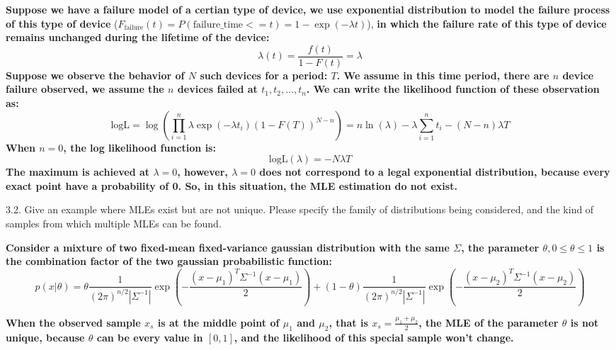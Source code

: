 \documentclass{article}
\theoremstyle{definition}
\theoremstyle{definition}
\theoremstyle{remark}
\begin{document}
\begin{addmargin}[3em]{2em}
  \textbf{Suppose we have a failure model of a certian type of device, we use exponential distribution to model the failure process of this type of device} ($F_{\mbox{failure}}(t) = P(\mbox{failure\_time} <= t) = 1 - \exp(-\lambda t)$), \textbf{in which the failure rate of this type of device remains unchanged during the lifetime of the device:}
  \[
  \lambda(t) = \frac{f(t)}{1 - F(t)} = \lambda
  \]
  \textbf{Suppose we observe the behavior of $N$ such devices for a period: $T$. We assume in this time period, there are $n$ device failure observed, we assume the $n$ devices failed at $t_1, t_2, \dots, t_n$. We can write the likelihood function of these observation as:}
  \[
  \mbox{logL} = \log(\prod_{i=1}^n \lambda \exp(-\lambda t_i) {(1-F(T))}^{N-n}) = n \ln(\lambda) - \lambda \sum_{i=1}^n t_i - (N-n) \lambda T
  \]
  \textbf{When $n = 0$, the log likelihood function is:}
  \[
  \mbox{logL}(\lambda) = - N \lambda T
  \]
  \textbf{The maximum is achieved at $\lambda = 0$, however, $\lambda = 0$ does not correspond to a legal exponential distribution, because every exact point have a probability of 0. So, in this situation, the MLE estimation do not exist.}
\end{addmargin}

3.2. Give an example where MLEs exist but are not unique. Please specify the family of distributions being considered, and the kind of samples from which multiple MLEs can be found.

\begin{addmargin}[3em]{2em}
  \textbf{Consider a mixture of two fixed-mean fixed-variance gaussian distribution with the same $\Sigma$, the parameter $\theta, 0 \leq \theta \leq 1$ is the combination factor of the two gaussian probabilistic function:}
  \[
  p(x | \theta) = \theta \frac{1}{{(2\pi)}^{n/2}|\Sigma^{-1}|} \exp(-\frac{(x - \mu_1)^T \Sigma^{-1} (x - \mu_1)}{2}) + (1 - \theta) \frac{1}{{(2\pi)}^{n/2}|\Sigma^{-1}|} \exp(-\frac{{(x - \mu_2)}^T \Sigma^{-1} (x - \mu_2)}{2})
  \]

  \textbf{When the observed sample $x_s$ is at the middle point of $\mu_1$ and $\mu_2$, that is $x_s = \frac{\mu_1 + \mu_2}{2}$, the MLE of the parameter $\theta$ is not unique, because $\theta$ can be every value in $[0, 1]$, and the likelihood of this special sample won't change.}

\end{addmargin}
\end{document}

